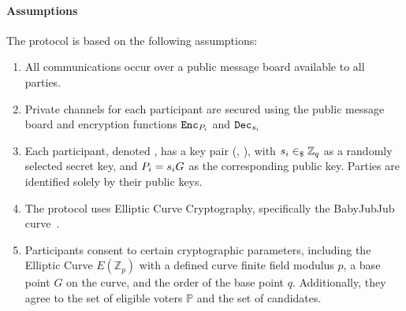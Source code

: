 \documentclass[runningheads]{llncs}
\begin{document}
\paragraph*{Assumptions}
The protocol is based on the following assumptions:
\begin{enumerate}
\item All communications occur over a public message board available to all parties.
\item Private channels for each participant are secured using the public message board and encryption functions $\texttt{Enc}_{P_{i}}$ and $\texttt{Dec}_{s_{i}}$
\item Each participant, denoted , has a key pair (, ), with $s_{i} \in_\$ \mathbb{Z}_q$ as a randomly selected secret key, and $P_{i} = s_{i} G$ as the corresponding public key. Parties are identified solely by their public keys.
\item The protocol uses Elliptic Curve Cryptography, specifically the BabyJubJub curve~\cite{whitehatBabyJubjubElliptic2020}.
\item Participants consent to certain cryptographic parameters, including the Elliptic Curve $E(\mathbb{Z}_p)$ with a defined curve finite field modulus $p$, a base point $G$ on the curve, and the order of the base point $q$. Additionally, they agree to the set of eligible voters $\mathbb{P}$ and the set of candidates.
\end{enumerate}
\end{document}
